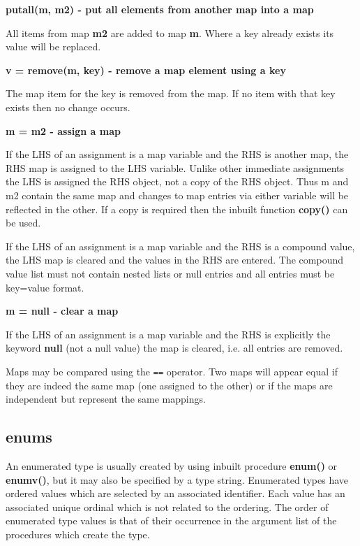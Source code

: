             {\bf putall(m, m2) - put all elements from another map into a map}
            
            All items from map {\bf m2} are added to map {\bf m}. Where a
            key already exists its value will be replaced.

            
            {\bf v = remove(m, key) - remove a map element using a key}
            
            The map item for the key is removed from the map.
            If no item with that key exists then no change occurs.
            
            
            {\bf m = m2 - assign a map}
            
            If the LHS of an assignment is a map variable and the RHS is another
            map, the RHS map is assigned to the LHS variable. Unlike other
            immediate assignments the LHS is assigned the RHS object, not a copy
            of the RHS object. Thus m and m2 contain the same map and changes to
            map entries  via either variable will be reflected in the other. If
            a copy is required then the inbuilt function {\bf
            copy()}  can be used.      

            If the LHS of an assignment is a map variable and the RHS is a
            compound value, the LHS map is cleared and the values in the RHS
            are entered. The compound value list must not contain nested lists
            or null entries and all entries must be key=value format.


            {\bf m = null - clear a map}

            If the LHS of an assignment is a map variable and the RHS is
            explicitly the keyword {\bf null} (not a null value) the map is
            cleared, i.e. all entries are removed.
            
            Maps may be compared using the \verb'==' operator. Two maps
            will appear equal if they are indeed the same map (one assigned to
            the other) or if the maps are independent but represent the
            same mappings.



        \subsection{enums}\label{sec:ssecenums}
        
            An enumerated type is usually created by using inbuilt procedure
            {\bf enum()} or {\bf enumv()}, but it may also be specified
            by a type string. Enumerated types have ordered values which are
            selected by an associated identifier. Each value has an
            associated unique ordinal which is not related to the ordering.
            The order of enumerated type values is that of their occurrence
            in the argument list of the procedures which create the type.

